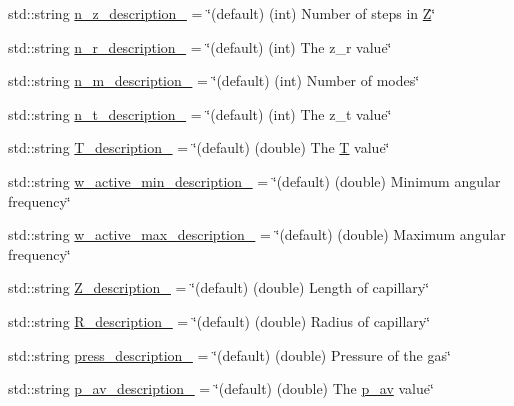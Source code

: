 \begin{DoxyCompactItemize}
\item 
std\+::string \hyperlink{class_config___settings_ab946186659a0945aa57b9f2040f371f2}{n\+\_\+z\+\_\+description\+\_\+} = \char`\"{}(default) (int) Number of steps in \hyperlink{class_config___settings_a1c01d83346316e0467ccbb0051e7461d}{Z}\char`\"{}
\item 
std\+::string \hyperlink{class_config___settings_a6de28ea73272b64b4e5bb5f7503dcd3d}{n\+\_\+r\+\_\+description\+\_\+} = \char`\"{}(default) (int) The z\+\_\+r value\char`\"{}
\item 
std\+::string \hyperlink{class_config___settings_a94712436ed1bc922c0ade9733eeeb71b}{n\+\_\+m\+\_\+description\+\_\+} = \char`\"{}(default) (int) Number of modes\char`\"{}
\item 
std\+::string \hyperlink{class_config___settings_a809c1dd8b250a20f60c4751cea818363}{n\+\_\+t\+\_\+description\+\_\+} = \char`\"{}(default) (int) The z\+\_\+t value\char`\"{}
\item 
std\+::string \hyperlink{class_config___settings_a6975e74e82073d2ae4d75c38fb56c83c}{T\+\_\+description\+\_\+} = \char`\"{}(default) (double) The \hyperlink{class_config___settings_a1ed40710ec225b2f91d275b4fc8f64ef}{T} value\char`\"{}
\item 
std\+::string \hyperlink{class_config___settings_a5465c1fbd2dc5e60c0c7e81c89291fe0}{w\+\_\+active\+\_\+min\+\_\+description\+\_\+} = \char`\"{}(default) (double) Minimum angular frequency\char`\"{}
\item 
std\+::string \hyperlink{class_config___settings_aec4b2d04c20b6d345a0cd31df2e896fa}{w\+\_\+active\+\_\+max\+\_\+description\+\_\+} = \char`\"{}(default) (double) Maximum angular frequency\char`\"{}
\item 
std\+::string \hyperlink{class_config___settings_a50cd3c7bc111833774726cd688e3a52b}{Z\+\_\+description\+\_\+} = \char`\"{}(default) (double) Length of capillary\char`\"{}
\item 
std\+::string \hyperlink{class_config___settings_adb774b19a0c38a58d6035087b949af72}{R\+\_\+description\+\_\+} = \char`\"{}(default) (double) Radius of capillary\char`\"{}
\item 
std\+::string \hyperlink{class_config___settings_a6c0508d29779a253834967377df98934}{press\+\_\+description\+\_\+} = \char`\"{}(default) (double) Pressure of the gas\char`\"{}
\item 
std\+::string \hyperlink{class_config___settings_afad39595749a9601390fcf4b284834fa}{p\+\_\+av\+\_\+description\+\_\+} = \char`\"{}(default) (double) The \hyperlink{class_config___settings_a6521140a63ae986c9b22990dbc1fa9e7}{p\+\_\+av} value\char`\"{}

\end{DoxyCompactItemize}
